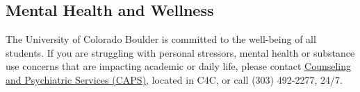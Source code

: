 \subsection*{Mental Health and Wellness}

The University of Colorado Boulder is committed to the well-being of all students. If you are struggling with personal stressors, mental health or substance use concerns that are impacting academic or daily life, please contact \href{https://www.colorado.edu/counseling/}{Counseling and Psychiatric Services (CAPS)}, located in C4C, or call (303) 492-2277, 24/7.


